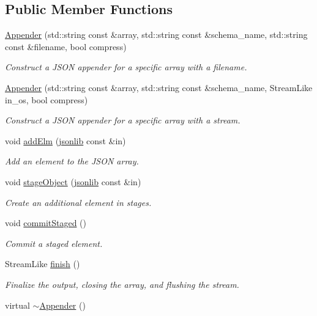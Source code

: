 \subsection*{Public Member Functions}
\begin{DoxyCompactItemize}
\item 
\hyperlink{structvt_1_1util_1_1json_1_1_appender_a15e12f1886f1082d9c5d94a49fe82d49}{Appender} (std\+::string const \&array, std\+::string const \&schema\+\_\+name, std\+::string const \&filename, bool compress)
\begin{DoxyCompactList}\small\item\em Construct a J\+S\+ON appender for a specific array with a filename. \end{DoxyCompactList}\item 
\hyperlink{structvt_1_1util_1_1json_1_1_appender_a147c5dc636bf3e028e54e984d8cfa502}{Appender} (std\+::string const \&array, std\+::string const \&schema\+\_\+name, Stream\+Like in\+\_\+os, bool compress)
\begin{DoxyCompactList}\small\item\em Construct a J\+S\+ON appender for a specific array with a stream. \end{DoxyCompactList}\item 
void \hyperlink{structvt_1_1util_1_1json_1_1_appender_a003145544b1a6a9013d69217528d2f4e}{add\+Elm} (\hyperlink{structvt_1_1util_1_1json_1_1_appender_aa822e25e24db1cdea96f00b79f55f492}{jsonlib} const \&in)
\begin{DoxyCompactList}\small\item\em Add an element to the J\+S\+ON array. \end{DoxyCompactList}\item 
void \hyperlink{structvt_1_1util_1_1json_1_1_appender_a8ba476b4b652c43fe6eecbc887c5bb6f}{stage\+Object} (\hyperlink{structvt_1_1util_1_1json_1_1_appender_aa822e25e24db1cdea96f00b79f55f492}{jsonlib} const \&in)
\begin{DoxyCompactList}\small\item\em Create an additional element in stages. \end{DoxyCompactList}\item 
void \hyperlink{structvt_1_1util_1_1json_1_1_appender_a1bec71bb4129153f778b4ab5ef9a1fa2}{commit\+Staged} ()
\begin{DoxyCompactList}\small\item\em Commit a staged element. \end{DoxyCompactList}\item 
Stream\+Like \hyperlink{structvt_1_1util_1_1json_1_1_appender_ab56d332c2a9c5f051d58dbec6803b780}{finish} ()
\begin{DoxyCompactList}\small\item\em Finalize the output, closing the array, and flushing the stream. \end{DoxyCompactList}\item 
virtual \hyperlink{structvt_1_1util_1_1json_1_1_appender_afc07753487e15d62f981c195d0ba6b17}{$\sim$\+Appender} ()
\end{DoxyCompactItemize}
